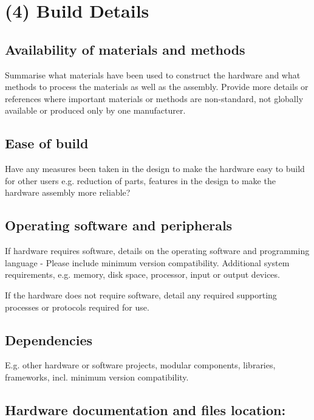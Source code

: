 \documentclass[a4paper]{article}
\begin{document}
\section{(4) Build Details}\label{h.l8i9vokvs0bj}

\subsection{Availability of materials and methods}\label{h.60suejv0jlzi}

Summarise what materials have been used to construct the hardware and
what methods to process the materials as well as the assembly. Provide
more details or references where important materials or methods are
non-standard, not globally available or produced only by one
manufacturer.


\subsection{Ease of build}\label{h.wg823sgyb1e4}

Have any measures been taken in the design to make the hardware easy to
build for other users e.g. reduction of parts, features in the design
to make the hardware assembly more reliable?


\subsection{Operating software and peripherals}\label{h.uz77dixfh5i4}

If hardware requires software, details on the operating software and
programming language - Please include minimum version compatibility.
Additional system requirements, e.g. memory, disk space, processor,
input or output devices.

If the hardware does not require software, detail any required
supporting processes or protocols required for use.


\subsection{Dependencies}\label{h.vr0vnjs8z9ar}

E.g. other hardware or software projects, modular components,
libraries, frameworks, incl. minimum version compatibility.


\subsection{Hardware documentation and files location:}\label{h.nbisrsde6sc3}
\end{document}
